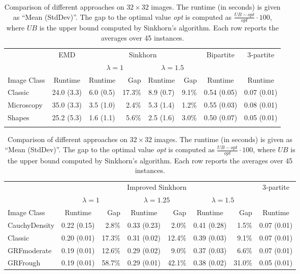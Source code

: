 \documentclass[al, 27pt, plainboxedsections, landscape]{sciposter}
\begin{document}
\begin{multicols}{3}
\begin{table}[t!]
\caption{Comparison of different approaches on $32 \times 32$ images. The runtime (in seconds) is given as ``Mean (StdDev)''.
The gap to the optimal value {\it opt} is computed as $\frac{UB-opt}{opt}\cdot 100$, where $UB$ is the upper bound computed by Sinkhorn's algorithm.
Each row reports the averages over 45 instances.
\label{tab:1}}
\centering
{\renewcommand{\arraystretch}{1.2}
\begin{tabular}{lccrcrcc}
      & \multicolumn{1}{c}{EMD\cite{Rubner98}} &  \multicolumn{4}{c}{Sinkhorn \cite{Cuturi2013}} & \multicolumn{1}{c}{Bipartite} & \multicolumn{1}{c}{$3$-partite} \\
	  & & \multicolumn{2}{c}{$\lambda=1$} & \multicolumn{2}{c}{$\lambda=1.5$} &  &  \\
Image Class & Runtime & Runtime & Gap & Runtime & Gap & Runtime & Runtime \\
\hline
Classic    & 24.0 (3.3) & 6.0 (0.5) & 17.3\% & 8.9 (0.7) & 9.1\%  & 0.54 (0.05) & 0.07 (0.01)\\
Microscopy & 35.0 (3.3) & 3.5 (1.0) &  2.4\% & 5.3 (1.4) & 1.2\% & 0.55 (0.03) & 0.08 (0.01)\\
Shapes     & 25.2 (5.3) & 1.6 (1.1) &  5.6\% & 2.5 (1.6) & 3.0\% & 0.50 (0.07) & 0.05 (0.01)\\
 \hline\noalign{\smallskip}
 \multicolumn{8}{c}{} \\
 \end{tabular}}
\centering
{\renewcommand{\arraystretch}{1.2}
\setlength{\tabcolsep}{5pt}
\begin{tabular}{lcrcrcrc}
      & \multicolumn{6}{c}{Improved Sinkhorn \cite{Solomon2015,Solomon2018}} & \multicolumn{1}{c}{$3$-partite} \\
	  & \multicolumn{2}{c}{$\lambda=1$} & \multicolumn{2}{c}{$\lambda=1.25$}  & \multicolumn{2}{c}{$\lambda=1.5$}  &  \\
Image Class     & Runtime           & Gap       & Runtime           & Gap       & Runtime           & Gap       &   Runtime \\
\hline
 CauchyDensity	&	0.22	(0.15)	&	2.8\%	&	0.33	(0.23)	&	2.0\%	&	0.41	(0.28)	&	1.5\%	&	0.07	(0.01)	\\
 Classic		&	0.20	(0.01)	&	17.3\%	&	0.31	(0.02)	&	12.4\%	&	0.39	(0.03)	&	9.1\%	&	0.07	(0.01)	\\
 GRFmoderate	&	0.19	(0.01)	&	12.6\%	&	0.29	(0.02)	&	9.0\%	&	0.37	(0.03)	&	6.6\%	&	0.07	(0.01)	\\
 GRFrough		&	0.19	(0.01)	&	58.7\%	&	0.29	(0.01)	&	42.1\%	&	0.38	(0.02)	&	31.0\%	&	0.05	(0.01)	\\

\end{tabular}}
\end{table}
\end{multicols}
\end{document}
